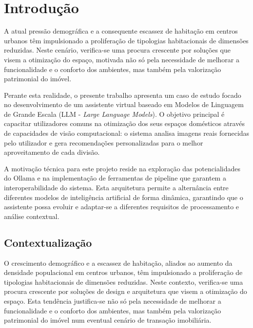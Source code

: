 \documentclass[a4paper,12pt]{scrreprt}
\begin{document}
\listoftables

\pagebreak





\chapter{Introdução}
    A atual pressão demográfica e a consequente escassez de habitação em centros urbanos têm impulsionado a proliferação de tipologias habitacionais de dimensões reduzidas. Neste cenário, verifica-se uma procura crescente por soluções que visem a otimização do espaço, motivada não só pela necessidade de melhorar a funcionalidade e o conforto dos ambientes, mas também pela valorização patrimonial do imóvel.

    Perante esta realidade, o presente trabalho apresenta um caso de estudo focado no desenvolvimento de um assistente virtual baseado em Modelos de Linguagem de Grande Escala (LLM - \textit{Large Language Models}). O objetivo principal é capacitar utilizadores comuns na otimização dos seus espaços domésticos através de capacidades de visão computacional: o sistema analisa imagens reais fornecidas pelo utilizador e gera recomendações personalizadas para o melhor aproveitamento de cada divisão.
    
    A motivação técnica para este projeto reside na exploração das potencialidades do Ollama \cite{ollama} e na implementação de ferramentas de pipeline que garantem a interoperabilidade do sistema. Esta arquitetura permite a alternância entre diferentes modelos de inteligência artificial de forma dinâmica, garantindo que o assistente possa evoluir e adaptar-se a diferentes requisitos de processamento e análise contextual.
    \section{Contextualização}
        O crescimento demográfico e a escassez de habitação, aliados ao aumento da densidade populacional em centros urbanos, têm impulsionado a proliferação de tipologias habitacionais de dimensões reduzidas. Neste contexto, verifica-se uma procura crescente por soluções de design e arquitetura que visem a otimização do espaço. Esta tendência justifica-se não só pela necessidade de melhorar a funcionalidade e o conforto dos ambientes, mas também pela valorização patrimonial do imóvel num eventual cenário de transação imobiliária.
\end{document}
